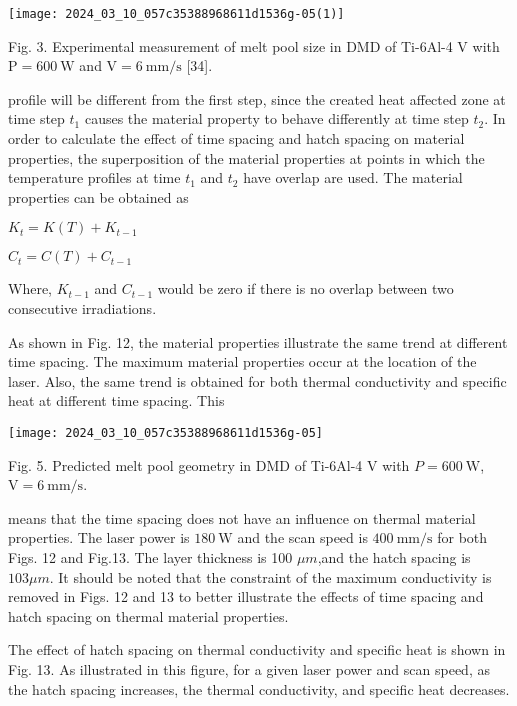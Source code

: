 \documentclass[10pt]{article}
\begin{document}
\begin{center}
\texttt{[image: 2024\_03\_10\_057c35388968611d1536g-05(1)]}
\end{center}

Fig. 3. Experimental measurement of melt pool size in DMD of Ti-6Al-4 V with $\mathrm{P}=600 \mathrm{~W}$ and $\mathrm{V}=6 \mathrm{~mm} / \mathrm{s}$ [34].

profile will be different from the first step, since the created heat affected zone at time step $t_{1}$ causes the material property to behave differently at time step $t_{2}$. In order to calculate the effect of time spacing and hatch spacing on material properties, the superposition of the material properties at points in which the temperature profiles at time $t_{1}$ and $t_{2}$ have overlap are used. The material properties can be obtained as

$K_{t}=K(T)+K_{t-1}$

$C_{t}=C(T)+C_{t-1}$

Where, $K_{t-1}$ and $C_{t-1}$ would be zero if there is no overlap between two consecutive irradiations.

As shown in Fig. 12, the material properties illustrate the same trend at different time spacing. The maximum material properties occur at the location of the laser. Also, the same trend is obtained for both thermal conductivity and specific heat at different time spacing. This

\begin{center}
\texttt{[image: 2024\_03\_10\_057c35388968611d1536g-05]}
\end{center}

Fig. 5. Predicted melt pool geometry in DMD of Ti-6Al-4 V with $P=600 \mathrm{~W}$, $\mathrm{V}=6 \mathrm{~mm} / \mathrm{s}$.

means that the time spacing does not have an influence on thermal material properties. The laser power is $180 \mathrm{~W}$ and the scan speed is $400 \mathrm{~mm} / \mathrm{s}$ for both Figs. 12 and Fig.13. The layer thickness is 100 $\mu m$,and the hatch spacing is $103 \mu m$. It should be noted that the constraint of the maximum conductivity is removed in Figs. 12 and 13 to better illustrate the effects of time spacing and hatch spacing on thermal material properties.

The effect of hatch spacing on thermal conductivity and specific heat is shown in Fig. 13. As illustrated in this figure, for a given laser power and scan speed, as the hatch spacing increases, the thermal conductivity, and specific heat decreases.
\end{document}
